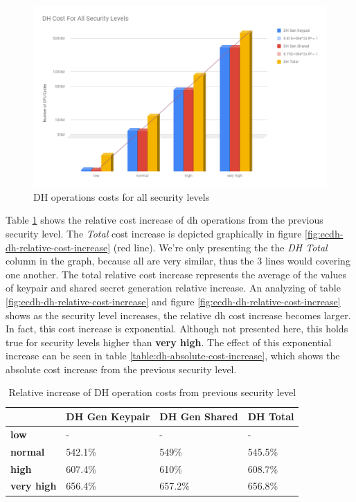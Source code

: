 \documentclass{llncs}
\begin{document}
  \begin{figure}
    \centering
    \includegraphics[width=1.0\textwidth]{img/dh_costs_all_sls.png}
    \centering \caption{\label{fig:dh-costs-all-sls} DH operations costs for all security levels}
  \end{figure}

Table \ref{table:dh-relative-cost-increase} shows the relative cost increase of \gls{dh} operations from the previous security level. The \textit{Total}
cost increase is depicted graphically in figure \ref{fig:ecdh-dh-relative-cost-increase} (red line). We're only presenting the the \textit{DH Total} column
in the graph, because all are very similar, thus the $3$ lines would covering one another. The total relative cost increase represents the average of the
values of keypair and shared secret generation relative increase. An analyzing of table \ref{fig:ecdh-dh-relative-cost-increase} and figure
\ref{fig:ecdh-dh-relative-cost-increase} shows as the security level increases, the relative \gls{dh} cost increase becomes larger. In fact,
this cost increase is exponential. Although not presented here, this holds true for security levels higher than \textbf{very high}.
The effect of this exponential increase can be seen in table \ref{table:dh-absolute-cost-increase}, which shows the absolute cost increase from
the previous security level.

\begin{table}[]
  \begin{tabular}{|l|l|l|l|}
  \hline
                     & \textbf{DH Gen Keypair} & \textbf{DH Gen Shared}   & \textbf{DH Total}   \\ \hline
  \textbf{low}       & -                       & -                      & -                       \\ \hline
  \textbf{normal}    & 542.1\%                 & 549\%                  & 545.5\%                 \\ \hline
  \textbf{high}      & 607.4\%                 & 610\%                  & 608.7\%                 \\ \hline
  \textbf{very high} & 656.4\%                 & 657.2\%                & 656.8\%                 \\ \hline
  \end{tabular}
  \centering \caption{\label{table:dh-relative-cost-increase} Relative increase of DH operation costs from previous security level}
  \end{table}
\end{document}
